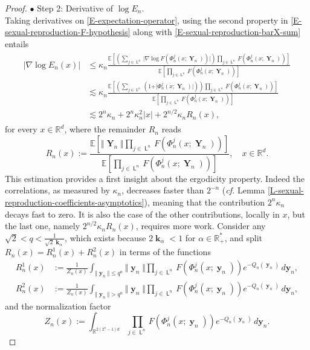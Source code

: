 \documentclass[reqno]{amsart}
\DeclareMathOperator{\Leaves}{\mathsf{L}}
\DeclareMathOperator{\bk}{\boldsymbol{k}}
\DeclareMathOperator{\by}{\mathbf{y}}
\DeclareMathOperator{\bY}{\mathbf{Y}}
\numberwithin{equation}{section}
\begin{document}
{\begin{proof}
$\bullet$ {\sc Step 2}: Derivative of $\log E_n$.\\
Taking derivatives on \eqref{E-expectation-operator}, using the second property in \eqref{E-sexual-reproduction-F-hypothesis} along with \eqref{E-sexual-reproduction-barX-sum} entails
\begin{align}\label{E-sexual-reproduction-log-derivative-an}
\begin{aligned}
\left\vert \nabla \log E_n(x)\right\vert& \leq \kappa_n\frac{\mathbb{E}\left[\left(\sum_{j\in \Leaves^n}\vert \nabla\log F(\Phi^j_n(x;\bY_n))\vert\right)\prod_{j\in \Leaves^n}F(\Phi^j_n(x;\bY_n))\right]}
{\mathbb{E}\left[\prod_{j\in \Leaves^n}F(\Phi^j_n(x;\bY_n))\right]}\\
&\lesssim\kappa_n\frac{\mathbb{E}\left[\left(\sum_{j\in \Leaves^n}(1+\vert \Phi^j_n(x;\bY_n)\vert)\right)\prod_{j\in \Leaves^n}F(\Phi^j_n(x;\bY_n))\right]}{\mathbb{E}\left[\prod_{j\in \Leaves^n}F(\Phi^j_n(x;\bY_n))\right]}\\ 
&\lesssim 2^n\kappa_n+2^n\kappa_n^2\vert x\vert+2^{n/2}\kappa_n R_n(x),
\end{aligned}
\end{align}
for every $x\in \mathbb{R}^d$, where the remainder $R_n$ reads
$$R_n(x):=\frac{\mathbb{E}\left[\Vert \bY_n\Vert\prod_{j\in \Leaves^n} F(\Phi^j_n(x;\bY_n))\right]}{\mathbb{E}\left[\prod_{j\in \Leaves^n} F(\Phi^j_n(x;\bY_n))\right]},\quad x\in \mathbb{R}^d.$$
This estimation provides a first insight about the ergodicity property. Indeed the correlations, as measured by $\kappa_n$, decreases faster than $2^{-n}$ ({\em cf.} Lemma \ref{L-sexual-reproduction-coefficients-asymptotics}), meaning that the contribution $2^n \kappa_n$ decays fast to zero. It is also the case of the other contributions, locally in $x$, but the last one, namely $2^{n/2}\kappa_n R_n(x)$, requires more work.
Consider any $\sqrt{2}<q<\frac{1}{\sqrt{2}\bk_\alpha}$, which exists because $2\bk_\alpha<1$ for $\alpha\in \mathbb{R}_+^*$, and split $R_n(x)=R_n^1(x)+R_n^2(x)$ in terms of the functions
\begin{align}
R_n^1(x)&:=\frac{1}{Z_n(x)}\int_{\Vert \by_n\Vert\leq q^n} \Vert \by_n\Vert\prod_{j\in \Leaves^n}F(\Phi^j_n(x;\by_n)) e^{-Q_n(\by_n)}\,d\mathbf{y}_n,\label{E-sexual-reproduction-b1}\\
R_n^2(x)&:=\frac{1}{Z_n(x)}\int_{\Vert \by_n\Vert> q^n} \Vert \by_n\Vert\prod_{j\in \Leaves^n}F(\Phi^j_n(x;\by_n)) e^{-Q_n(\by_n)}\,d\mathbf{y}_n,\label{E-sexual-reproduction-b2}
\end{align}
and the normalization factor
\begin{equation}\label{E-sexual-reproduction-ZA}
Z_n(x):=\int_{\mathbb{R}^{2(2^n-1)d}}\prod_{j\in \Leaves^n}F(\Phi^j_n(x;\by_n))e^{-Q_n(\by_n)}\,d\mathbf{y}_n.
\end{equation}


\end{proof}}
\end{document}
